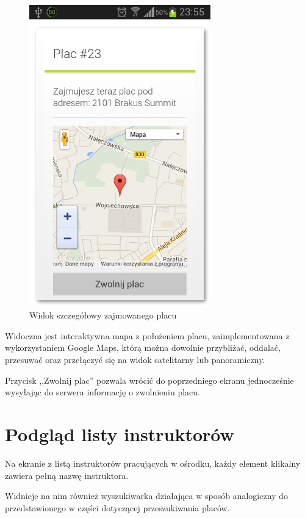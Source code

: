 \documentclass[twoside,a4paper,openright,12pt]{book}
\begin{document}
\begin{figure}[H]
\centering
\includegraphics[width=0.7\textwidth]{screenshots/android/szczegoly_placu.png}
\caption{Widok szczegółowy zajmowanego placu}
\label{fig:Zajmowany_plac_mobile}
\end{figure}

Widoczna jest interaktywna mapa z położeniem placu, zaimplementowana z wykorzystaniem Google Maps, którą można dowolnie przybliżać, oddalać, przesuwać oraz przełączyć się na widok satelitarny lub panoramiczny.

Przycisk ,,Zwolnij plac'' pozwala wrócić do poprzedniego ekranu jednocześnie wysyłając do serwera informację o zwolnieniu placu.




\section{Podgląd listy instruktorów}

Na ekranie z listą instruktorów pracujących w ośrodku, każdy element klikalny zawiera pełną nazwę instruktora.

Widnieje na nim również wyszukiwarka działająca w sposób analogiczny do przedstawionego w części dotyczącej przeszukiwania placów.
\end{document}
